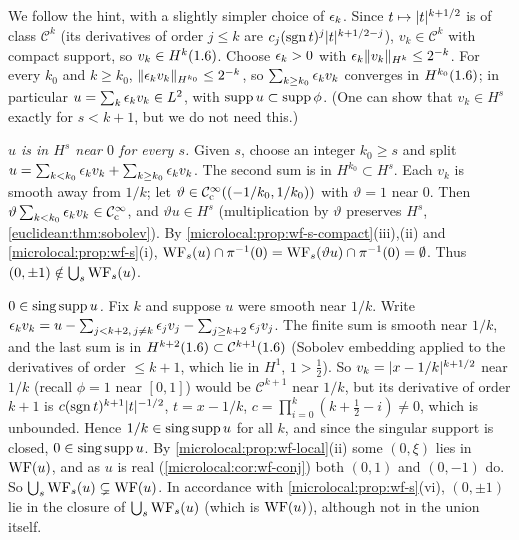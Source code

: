 \subsection*{}
We follow the hint, with a slightly simpler choice of $\epsilon_k$. Since $t\mapsto\lvert t\rvert^{k+1/2}$ is
of class $\mathcal C^k$ (its derivatives of order $j\le k$ are $c_j(\operatorname{sgn} t)^j\lvert t\rvert^{k+1/2-j}$),
$v_k\in\mathcal C^k$ with compact support, so $v_k\in H^k(1.6)$. Choose $\epsilon_k>0$ with
$\epsilon_k\lVert v_k\rVert_{H^k}\le2^{-k}$. For every $k_0$ and $k\ge k_0$, $\lVert \epsilon_kv_k\rVert_{H^{k_0}}\le2^{-k}$, so
$\sum_{k\ge k_0}\epsilon_kv_k$ converges in $H^{k_0}(1.6)$; in particular $u=\sum_k\epsilon_kv_k\in L^2$, with
$\operatorname{supp} u\subset\operatorname{supp}\phi$. (One can show that $v_k\in H^s$ exactly for $s<k+1$, but we do not need this.)

\emph{$u$ is in $H^s$ near $0$ for every $s$.} Given $s$, choose an integer $k_0\ge s$ and split
$u=\sum_{k<k_0}\epsilon_kv_k+\sum_{k\ge k_0}\epsilon_kv_k$. The second sum is in $H^{k_0}\subset H^s$. Each $v_k$ is
smooth away from $1/k$; let $\vartheta\in\mathcal{C}^\infty_{\mathrm{c}}((-1/k_0,1/k_0))$ with $\vartheta=1$ near $0$. Then
$\vartheta\sum_{k<k_0}\epsilon_kv_k\in\mathcal{C}^\infty_{\mathrm{c}}$, and $\vartheta u\in H^s$ (multiplication by $\vartheta$ preserves $H^s$,
\cref{euclidean:thm:sobolev}). By \cref{microlocal:prop:wf-s-compact}(iii),(ii) and
\cref{microlocal:prop:wf-s}(i), $\operatorname{WF}_s(u)\cap\pi^{-1}(0)=\operatorname{WF}_s(\vartheta u)\cap\pi^{-1}(0)=\emptyset$. Thus
$(0,\pm1)\notin\bigcup_s\operatorname{WF}_s(u)$.

\emph{$0\in\operatorname{sing\,supp} u$.} Fix $k$ and suppose $u$ were smooth near $1/k$. Write
$\epsilon_kv_k=u-\sum_{j<k+2,\,j\ne k}\epsilon_jv_j-\sum_{j\ge k+2}\epsilon_jv_j$. The finite sum is smooth near $1/k$, and
the last sum is in $H^{k+2}(1.6)\subset\mathcal C^{k+1}(1.6)$ (Sobolev embedding applied to the derivatives
of order $\le k+1$, which lie in $H^1$, $1>\frac12$). So $v_k=\lvert x-1/k\rvert^{k+1/2}$ near $1/k$ (recall
$\phi=1$ near $[0,1]$) would be $\mathcal C^{k+1}$ near $1/k$, but its derivative of order $k+1$ is
$c(\operatorname{sgn} t)^{k+1}\lvert t\rvert^{-1/2}$, $t=x-1/k$, $c=\prod_{i=0}^{k}(k+\frac12-i)\ne0$, which is unbounded. Hence
$1/k\in\operatorname{sing\,supp} u$ for all $k$, and since the singular support is closed, $0\in\operatorname{sing\,supp} u$. By
\cref{microlocal:prop:wf-local}(ii) some $(0,\xi)$ lies in $\operatorname{WF}(u)$, and as $u$ is real
(\cref{microlocal:cor:wf-conj}) both $(0,1)$ and $(0,-1)$ do. So
$\bigcup_s\operatorname{WF}_s(u)\subsetneq\operatorname{WF}(u)$. In accordance with \cref{microlocal:prop:wf-s}(vi), $(0,\pm1)$ lie in
the closure of $\bigcup_s\operatorname{WF}_s(u)$ (which is $\operatorname{WF}(u)$), although not in the union itself.

